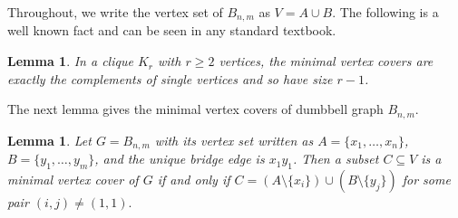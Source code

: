 \documentclass[12pt]{article}
\theoremstyle{plain}
\newtheorem{lemma}[theorem]{Lemma}
\theoremstyle{definition}
\newcommand{\V}{V}
\newcommand{\A}{A}
\newcommand{\B}{B}
\begin{document}
	
	 Throughout, we write the vertex set of $B_{n,m}$ as $\V=\A\cup\B$. The following is a well known fact and can be seen in any standard textbook.	
	\begin{lemma}
		In a clique $K_{r}$ with $r\ge 2$ vertices, the minimal vertex covers are exactly the complements of single vertices and so have size $r-1$.
	\end{lemma}
	
	
	The next lemma gives the minimal vertex covers of dumbbell graph $B_{n,m}$.
	\begin{lemma}\label{lem:mincov-dumbbell}
		Let $G=B_{n,m}$ with its vertex set written as
		$\A=\{x_1,\dots,x_n\}$, $\B=\{y_1,\dots,y_m\}$, and the unique bridge edge is $x_1y_1$.
		Then a subset $C\subseteq \V$ is a minimal vertex cover of $G$ if and only if
		$C  =  (\A\setminus\{x_i\})  \cup (\B\setminus\{y_j\})$ for some pair $(i,j)\neq(1,1).$ 
	\end{lemma}
	
\end{document}
